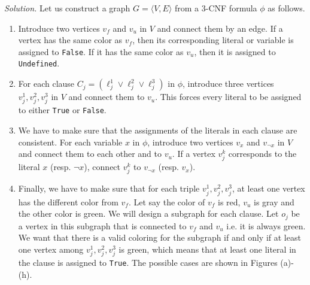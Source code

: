 \textit{Solution.} Let us construct a graph $G=\langle V,E\rangle$ from a $3$-CNF formula $\phi$ as follows.
\begin{enumerate}
  \item Introduce two vertices $v_f$ and $v_u$ in $V$ and connect them by an edge. If a vertex has the same color as $v_f$, then its corresponding literal or variable is assigned to \texttt{False}. If it has the same color as $v_u$, then it is assigned to \texttt{Undefined}.
  \item For each clause $C_j=(\ell_{j}^{1}\vee \ell_{j}^{2}\vee \ell_{j}^{3})$ in $\phi$, introduce three vertices $v_{j}^{1}, v_{j}^{2}, v_{j}^{3}$ in $V$ and connect them to $v_u$. This forces every literal to be assigned to either \texttt{True} or \texttt{False}.
  \item We have to make sure that the assignments of the literals in each clause are consistent. For each variable $x$ in $\phi$, introduce two vertices $v_{x}$ and $v_{\neg x}$ in $V$ and connect them to each other and to $v_u$. If a vertex $v_j^k$ corresponds to the literal $x$ (resp. $\neg x$), connect $v_j^k$ to $v_{\neg x}$ (resp. $v_x$).
  \item Finally, we have to make sure that for each triple $v_{j}^{1}, v_{j}^{2}, v_{j}^{3}$, at least one vertex has the different color from $v_f$. Let say the color of $v_f$ is red, $v_u$ is gray and the other color is green. We will design a subgraph for each clause. Let $o_j$ be a vertex in this subgraph that is connected to $v_f$ and $v_u$ i.e. it is always green. We want that there is a valid coloring for the subgraph if and only if at least one vertex among $v_{j}^{1}, v_{j}^{2}, v_{j}^{3}$ is green, which means that at least one literal in the clause is assigned to \texttt{True}. The possible cases are shown in Figures (a)-(h).
        \begin{figure}[ht]
          \centering
          \begin{subfigure}{0.45\textwidth}
            \centering
\end{subfigure}
\end{figure}
\end{enumerate}
